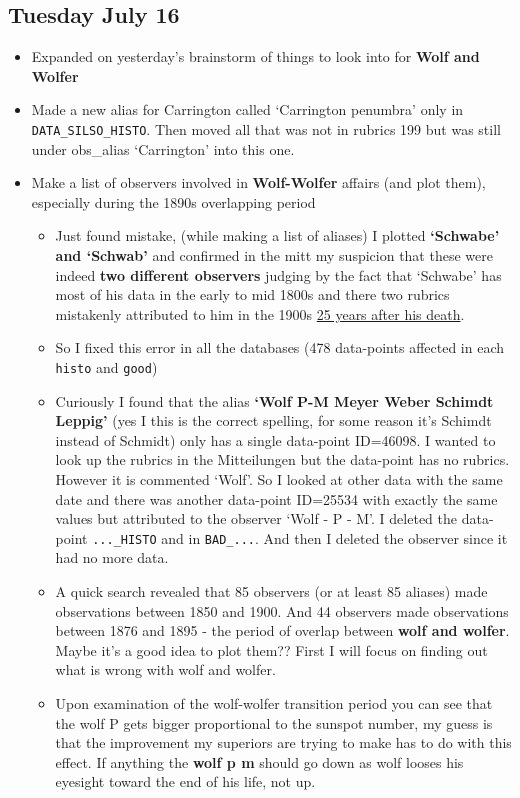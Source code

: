 \documentclass[12pt]{article}
\begin{document}
\subsection{Tuesday July 16}
\begin{itemize}
    \item Expanded on yesterday's brainstorm of things to look into for \textbf{Wolf and Wolfer}
    \item Made a new alias for Carrington called `Carrington penumbra' only in \texttt{DATA\_SILSO\_HISTO}. Then moved all that was not in rubrics 199 but was still under obs\_alias `Carrington' into this one.
    \item Make a list of observers involved in \textbf{Wolf-Wolfer} affairs (and plot them), especially during the 1890s overlapping period
    \begin{itemize}
        \item Just found mistake, (while making a list of aliases) I plotted \textbf{`Schwabe' and `Schwab'} and confirmed in the mitt my suspicion that these were indeed \textbf{two different observers} judging by the fact that `Schwabe' has most of his data in the early to mid 1800s and there two rubrics mistakenly attributed to him in the 1900s \href{https://en.wikipedia.org/wiki/Heinrich_Schwabe}{25 years after his death}.
        \item So I fixed this error in all the databases (478 data-points affected in each 
        \texttt{histo} and \texttt{good})
        \item Curiously I found that the alias \textbf{`Wolf P-M Meyer Weber Schimdt Leppig'} (yes I this is the correct spelling, for some reason it's Schimdt instead of Schmidt) only has a single data-point ID=46098. I wanted to look up the rubrics in the Mitteilungen but the data-point has no rubrics. However it is commented `Wolf'. So I looked at other data with the same date and there was another data-point ID=25534 with exactly the same values but attributed to the observer `Wolf - P - M'. I deleted the data-point \texttt{...\_HISTO} and in \texttt{BAD\_...}. And then I deleted the observer since it had no more data. 
        \item A quick search revealed that 85 observers (or at least 85 aliases) made observations between 1850 and 1900. And 44 observers made observations between 1876 and 1895 - the period of overlap between \textbf{wolf and wolfer}. Maybe it's a good idea to plot them?? First I will focus on finding out what is wrong with wolf and wolfer.
        \item Upon examination of the wolf-wolfer transition period you can see that the wolf P gets bigger proportional to the sunspot number, my guess is that the improvement my superiors are trying to make has to do with this effect. If anything the \textbf{wolf p m} should go down as wolf looses his eyesight toward the end of his life, not up.

\end{itemize}
\end{itemize}
\end{document}
